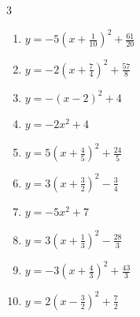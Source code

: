 \begin{multicols}{3}
\begin{enumerate}
  \item $\displaystyle y=-5\left( x+\frac{1}{10}\right)^{2}+\frac{61}{20}$


  \item $\displaystyle y=-2\left( x+\frac{7}{4}\right)^{2}+\frac{57}{8}$


  \item $\displaystyle y=-\left( x-2\right)^{2}+4$

        \phantom{$\displaystyle 頂点\left( 2 , 4 \right)$}

  \item $\displaystyle y=-2x^{2}+4$

        \phantom{$\displaystyle 頂点\left( 0 , 4 \right)$}

  \item $\displaystyle y=5\left( x+\frac{4}{5}\right)^{2}+\frac{24}{5}$


  \item $\displaystyle y=3\left( x+\frac{3}{2}\right)^{2}-\frac{3}{4}$


  \item $\displaystyle y=-5x^{2}+7$

        \phantom{$\displaystyle 頂点\left( 0 , 7 \right)$}

  \item $\displaystyle y=3\left( x+\frac{1}{3}\right)^{2}-\frac{28}{3}$


  \item $\displaystyle y=-3\left( x+\frac{4}{3}\right)^{2}+\frac{43}{3}$


\columnbreak %

\resetques

  \item $\displaystyle y=2\left( x-\frac{3}{2}\right)^{2}+\frac{7}{2}$



\end{enumerate}
\end{multicols}
